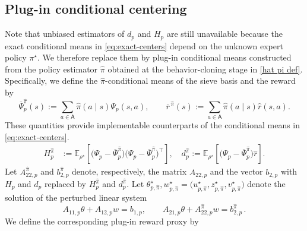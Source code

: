 \documentclass{article}
\theoremstyle{definition}
\theoremstyle{remark}
\theoremstyle{plain}
\def\eqsp{\,}
\newcommand{\dsieve}{p}
\numberwithin{equation}{section}
\begin{document}
\subsection{Plug-in conditional centering}
\label{subsec:plugin-centering}
Note that unbiased estimators of  \(d_\dsieve\) and  \(H_\dsieve\) are still unavailable because the exact conditional means in \eqref{eq:exact-centers} depend on the unknown expert policy \(\pi^\star\). We therefore replace them by plug-in conditional means constructed from the policy estimator \(\widehat\pi\) obtained at the behavior-cloning stage in  \eqref{hat pi def}. 
Specifically, we define the \(\widehat\pi\)-conditional means of the sieve basis and the reward by
\begin{equation}
\label{eq:plugin-centers}
    \overline\Psi_\dsieve^{\widehat\pi}(s)
    :=
    \sum_{a\in\mathsf A}
    \widehat\pi(a\mid s)\Psi_\dsieve(s,a),
    \qquad
    \overline{r}^{\,\widehat\pi}(s)
    :=
    \sum_{a\in\mathsf A}
    \widehat\pi(a\mid s)\widehat r(s,a).
\end{equation}
These quantities provide implementable counterparts of the conditional means in \eqref{eq:exact-centers}. 
\begin{align}
\label{eq:plugin-H-d}
    H_\dsieve^{\widehat\pi}
    &:=
    \mathbb E_{\rho^\star}
    \left[
        \big(\Psi_\dsieve-\overline\Psi_\dsieve^{\widehat\pi}\big)
        \big(\Psi_\dsieve-\overline\Psi_\dsieve^{\widehat\pi}\big)^\top
    \right],\quad
    d_\dsieve^{\widehat\pi}
    :=
    \mathbb E_{\rho^\star}
    \left[
        \big(\Psi_\dsieve-\overline\Psi_\dsieve^{\widehat\pi}\big)
        \widehat r
    \right].
\end{align}
Let \(A_{22,\dsieve}^{\widehat\pi}\) and \(b_{2,\dsieve}^{\widehat\pi}\) denote, respectively, the matrix \(A_{22,\dsieve}\) and the vector \(b_{2,\dsieve}\) with \(H_\dsieve\) and \(d_\dsieve\) replaced by \(H_\dsieve^{\widehat\pi}\) and \(d_\dsieve^{\widehat\pi}\). Let
\(
    \theta_{\dsieve,\widehat\pi}^\star,
    w^\star_{\dsieve,\widehat\pi}
    =
    \bigl(
        u_{\dsieve,\widehat\pi}^\star,
        z_{\dsieve,\widehat\pi}^\star,
        v_{\dsieve,\widehat\pi}^\star
    \bigr)
\)
denote the solution of the perturbed linear system
\begin{equation}
\label{eq:TTSA-population-form-perturb}
    A_{11,\dsieve}\theta+A_{12,\dsieve}w=b_{1,\dsieve},
    \qquad
    A_{21,\dsieve}\theta+A_{22,\dsieve}^{\widehat\pi}w
    =
    b_{2,\dsieve}^{\widehat\pi}\eqsp.
\end{equation}
We define the corresponding plug-in reward proxy by
\end{document}
